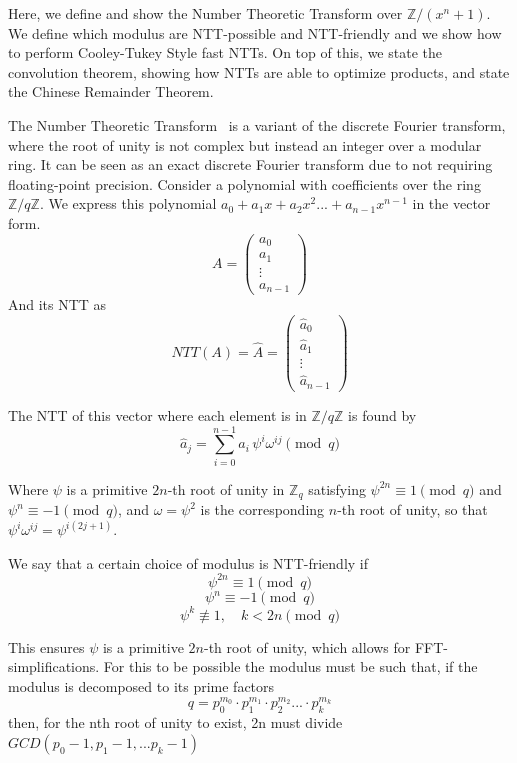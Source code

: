 \documentclass[runningheads]{llncs}
\begin{document}
Here, we define and show the Number Theoretic Transform over $\mathbb{Z}/(x^n+1)$. We define which modulus are NTT-possible and NTT-friendly and we show how to perform Cooley-Tukey Style fast NTTs. On top of this, we state the convolution theorem, showing how NTTs are able to optimize products, and state the Chinese Remainder Theorem.

\begin{definition}

    The Number Theoretic Transform~\cite{pollard1971fft} is a variant of the discrete Fourier transform, where the root of unity is not complex but instead an integer over a modular ring. It can be seen as an exact discrete Fourier transform due to not requiring floating-point precision. Consider a polynomial with coefficients over the ring $\mathbb{Z} / q\mathbb{Z}$. We express this polynomial $a_0+a_1x+a_2x^{2}... +a_{n-1}x^{n-1}$ in the vector form.
$$A=\begin{pmatrix}
a_0 \\
a_1 \\
\vdots \\
a_{n-1}
    \end{pmatrix} $$
And its NTT as
$$NTT(A)=\hat{A}=\begin{pmatrix}
\hat{a}_0 \\
\hat{a}_1 \\
\vdots \\
\hat{a}_{n-1}
    \end{pmatrix}$$

The NTT of this vector where each element is in $\mathbb{Z} / q\mathbb{Z}$ is found by
$$\hat{a}_j=\sum_{i=0}^{n-1}a_{i}\,\psi^{i}\omega^{ij} \pmod{q}$$

Where $\psi$ is a primitive $2n$-th root of unity in $\mathbb{Z}_q$ satisfying $\psi^{2n} \equiv 1 \pmod{q}$ and $\psi^n \equiv -1 \pmod{q}$, and $\omega = \psi^2$ is the corresponding $n$-th root of unity, so that $\psi^i\omega^{ij} = \psi^{i(2j+1)}$.
\end{definition}

\begin{definition}
    We say that a certain choice of modulus is NTT-friendly if
    $$\psi^{2n}\equiv1 \pmod{q}$$
    $$\psi^{n}\equiv-1 \pmod{q}$$
    $$\psi^{k}\not\equiv1, \quad k<2n \pmod{q}$$

    This ensures $\psi$ is a primitive $2n$-th root of unity, which allows for FFT-simplifications. For this to be possible the modulus must be such that, if the modulus is decomposed to its prime factors
$$q=p_0^{m_0}\cdotp p_1^{m_1}\cdotp p_2^{m_2}...\cdotp p_{k}^{m_{k}} $$
    then, for the nth root of unity to exist, 2n must divide $GCD(p_{0}-1,p_1-1,...p_k-1)$
\end{definition}
\end{document}
